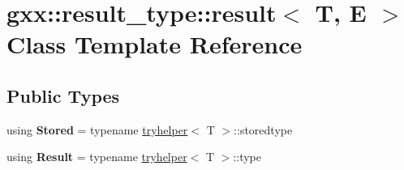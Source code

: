 \hypertarget{classgxx_1_1result__type_1_1result}{}\section{gxx\+:\+:result\+\_\+type\+:\+:result$<$ T, E $>$ Class Template Reference}
\label{classgxx_1_1result__type_1_1result}
\subsection*{Public Types}
\begin{DoxyCompactItemize}
\item 
using {\bfseries Stored} = typename \hyperlink{structgxx_1_1result__type_1_1tryhelper}{tryhelper}$<$ T $>$\+::storedtype\hypertarget{classgxx_1_1result__type_1_1result_a48e0e6641bf13b7282358d266bba3a31}{}\label{classgxx_1_1result__type_1_1result_a48e0e6641bf13b7282358d266bba3a31}

\item 
using {\bfseries Result} = typename \hyperlink{structgxx_1_1result__type_1_1tryhelper}{tryhelper}$<$ T $>$\+::type\hypertarget{classgxx_1_1result__type_1_1result_ad5269750c80468a7d2319594093edfae}{}\label{classgxx_1_1result__type_1_1result_ad5269750c80468a7d2319594093edfae}

\end{DoxyCompactItemize}
